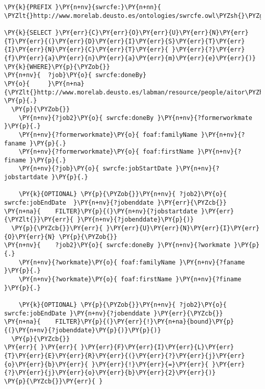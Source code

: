 \expandafter\def\csname PY@tok@err\endcsname{}
\begin{Verbatim}[commandchars=\\\{\}]
\PY{k}{PREFIX }\PY{n+nv}{swrcfe:}\PY{n+nn}{ \PYZlt{}http://www.morelab.deusto.es/ontologies/swrcfe.owl\PYZsh{}\PYZgt{}}

\PY{k}{SELECT }\PY{err}{C}\PY{err}{O}\PY{err}{U}\PY{err}{N}\PY{err}{T}\PY{err}{(}\PY{err}{D}\PY{err}{I}\PY{err}{S}\PY{err}{T}\PY{err}{I}\PY{err}{N}\PY{err}{C}\PY{err}{T}\PY{err}{ }\PY{err}{?}\PY{err}{f}\PY{err}{a}\PY{err}{n}\PY{err}{a}\PY{err}{m}\PY{err}{e}\PY{err}{)} \PY{k}{WHERE}\PY{p}{\PYZob{}}
\PY{n+nv}{  ?job}\PY{o}{ swrcfe:doneBy}
\PY{o}{     }\PY{n+na}{\PYZlt{}http://www.morelab.deusto.es/labman/resource/people/aitor\PYZhy{}gomez\PYZhy{}goiri\PYZgt{}} \PY{p}{.}
  \PY{p}{\PYZob{}}
    \PY{n+nv}{?job2}\PY{o}{ swrcfe:doneBy }\PY{n+nv}{?formerworkmate }\PY{p}{.}
    \PY{n+nv}{?formerworkmate}\PY{o}{ foaf:familyName }\PY{n+nv}{?faname }\PY{p}{.}
    \PY{n+nv}{?formerworkmate}\PY{o}{ foaf:firstName }\PY{n+nv}{?finame }\PY{p}{.}
    \PY{n+nv}{?job}\PY{o}{ swrcfe:jobStartDate }\PY{n+nv}{?jobstartdate }\PY{p}{.}

    \PY{k}{OPTIONAL} \PY{p}{\PYZob{}}\PY{n+nv}{ ?job2}\PY{o}{ swrcfe:jobEndDate  }\PY{n+nv}{?jobenddate }\PY{err}{\PYZcb{}}
\PY{n+na}{    FILTER}\PY{p}{(}\PY{n+nv}{?jobstartdate }\PY{err}{\PYZlt{}}\PY{err}{ }\PY{n+nv}{?jobenddate}\PY{p}{)}
  \PY{p}{\PYZcb{}}\PY{err}{ }\PY{err}{U}\PY{err}{N}\PY{err}{I}\PY{err}{O}\PY{err}{N} \PY{p}{\PYZob{}}
\PY{n+nv}{    ?job2}\PY{o}{ swrcfe:doneBy }\PY{n+nv}{?workmate }\PY{p}{.}
    \PY{n+nv}{?workmate}\PY{o}{ foaf:familyName }\PY{n+nv}{?faname }\PY{p}{.}
    \PY{n+nv}{?workmate}\PY{o}{ foaf:firstName }\PY{n+nv}{?finame }\PY{p}{.}

    \PY{k}{OPTIONAL} \PY{p}{\PYZob{}}\PY{n+nv}{ ?job2}\PY{o}{ swrcfe:jobEndDate }\PY{n+nv}{?jobenddate }\PY{err}{\PYZcb{}}
\PY{n+na}{    FILTER}\PY{p}{(}\PY{err}{!}\PY{n+na}{bound}\PY{p}{(}\PY{n+nv}{?jobenddate}\PY{p}{)}\PY{p}{)}
  \PY{p}{\PYZcb{}}
\PY{err}{ }\PY{err}{ }\PY{err}{F}\PY{err}{I}\PY{err}{L}\PY{err}{T}\PY{err}{E}\PY{err}{R}\PY{err}{(}\PY{err}{?}\PY{err}{j}\PY{err}{o}\PY{err}{b}\PY{err}{ }\PY{err}{!}\PY{err}{=}\PY{err}{ }\PY{err}{?}\PY{err}{j}\PY{err}{o}\PY{err}{b}\PY{err}{2}\PY{err}{)}
\PY{p}{\PYZcb{}}\PY{err}{ }
\end{Verbatim}
